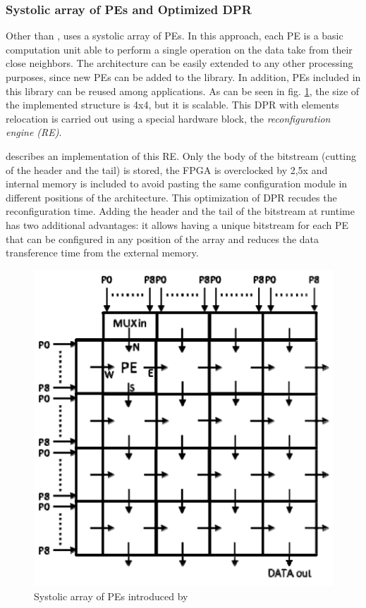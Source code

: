 \subsubsection{Systolic array of PEs and Optimized DPR}
\label{sec:dpr}
Other than \cite{virtex4}, \cite{dpr} uses a systolic array of PEs. In this approach, each PE is a basic computation unit able to perform a single operation on the data take from their close neighbors. The architecture can be easily extended to any other processing purposes, since new PEs can be added to the library. In addition, PEs included in this library can be reused among applications. As can be seen in fig. \ref{fig:pe}, the size of the implemented structure is 4x4, but it is scalable. This DPR with elements relocation is carried out using a special hardware block, the \emph{reconfiguration engine (RE)}.

\cite{dpr} describes an implementation of this RE. Only the body of the bitstream (cutting of the header and the tail) is stored, the FPGA is overclocked by 2,5x and internal memory is included to avoid pasting the same configuration module in different positions of the architecture. This optimization of DPR recudes the reconfiguration time. Adding the header and the tail of the bitstream at runtime has two additional advantages: it allows having a unique bitstream for each PE that can be configured in any position of the array and reduces the data transference time from the external memory.

\begin{figure}[htb]%
\includegraphics[width=\columnwidth]{Pictures/PE}%
\caption{Systolic array of PEs introduced by \cite{dpr}}%
\label{fig:pe}%
\end{figure}

